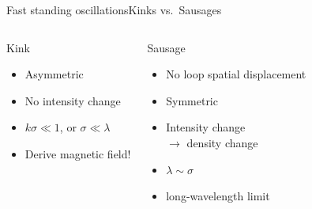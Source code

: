 \documentclass[table]{beamer}
\begin{document}
\begin{frame}{Fast standing oscillations}{Kinks vs.\ Sausages}
\begin{columns}
\begin{block}{Kink}
\begin{itemize}
            \item Asymmetric
            \item No intensity change
            \item $k\sigma \ll 1$, or $\sigma\ll\lambda$
            \item \textcolor{arylyellow}{Derive magnetic field!}
        \end{itemize}
    \end{block}
    \begin{block}{Sausage}
        \begin{itemize}
            \item No loop spatial displacement
            \item Symmetric
            \item Intensity change\\ $\rightarrow$ density change
            \item $\lambda\sim\sigma$
            \item long-wavelength limit
        \end{itemize}
    \end{block}
\end{columns}
\end{frame}%
\end{document}
